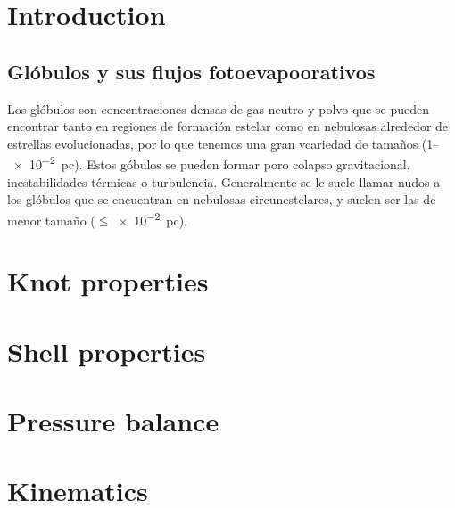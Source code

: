 \documentclass[twocolumn, times]{aastex631}
\begin{document}


\section{Introduction}
\label{sec:introduction}

\subsection{Glóbulos y sus flujos fotoevapoorativos}
Los glóbulos son concentraciones densas de gas neutro y polvo que se pueden encontrar tanto en regiones de formación estelar como en nebulosas alrededor de estrellas evolucionadas, por lo que tenemos una gran vcariedad de tamaños (1--\SI{e-2}{pc}). Estos góbulos se pueden formar poro colapso gravitacional, inestabilidades térmicas o turbulencia. Generalmente se le suele llamar nudos a los glóbulos que se encuentran en nebulosas circunestelares, y suelen ser las de menor tamaño ($\leq$\SI{e-2}{pc}).
\section{Knot properties}
\label{sec:knot-properties}

\section{Shell properties}
\label{sec:shell-properties}


\section{Pressure balance}
\label{sec:pressure-balance}


\section{Kinematics}
\label{sec:kinematics}
\end{document}
